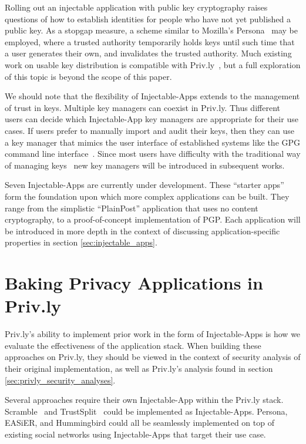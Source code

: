 \documentclass[letterpaper,twocolumn,10pt]{article}
\begin{document}
Rolling out an injectable application with public key cryptography raises 
questions of how to establish identities for people who have not yet published a 
public key. As a stopgap measure, a scheme similar to Mozilla's 
Persona~\cite{Mozilla.org2013}
may be employed, where a trusted authority temporarily holds keys until such time 
that a user generates their own, and invalidates the trusted authority. Much existing
work on usable key distribution is compatible with Priv.ly~\cite{Beato2011,LeapEncryptionAccessProject2013}, but a full exploration of
this topic is beyond the scope of this paper.

We should note that the flexibility of Injectable-Apps 
extends to the management of trust in keys. Multiple key managers can coexist in Priv.ly. 
Thus different users can decide which Injectable-App key managers are appropriate for
their use cases. If users prefer to manually import and audit
their keys, then they can use a key manager that mimics the user interface of 
established systems like the GPG command line interface~\cite{Project2013}. 
Since most users have difficulty with the traditional way of managing keys~\cite{Fahl2012,Whitten1999}
new key managers will be introduced in subsequent works.

Seven Injectable-Apps are currently under development. These ``starter apps'' form
the foundation upon which more complex applications can be built. They range from
the simplistic ``PlainPost'' application that uses no content cryptography, to
a proof-of-concept implementation of PGP. Each application will be introduced in
more depth in the context of discussing application-specific properties in section \ref{sec:injectable_apps}.

\section{Baking Privacy Applications in Priv.ly} \label{sec:privly_subsumed_use_cases}

Priv.ly's ability to implement prior work in the form of Injectable-Apps is how we 
evaluate the effectiveness of the application stack. When building these 
approaches on Priv.ly, they should be viewed in the context of security analysis of 
their original implementation, as well as Priv.ly's analysis found in section 
\ref{sec:privly_security_analyses}.

Several approaches require their own Injectable-App within the Priv.ly stack. 
Scramble~\cite{Beato2011} and TrustSplit~\cite{Fahl2012a} could be implemented as Injectable-Apps.
Persona, EASiER, and Hummingbird could all be seamlessly implemented on top of existing social networks
using Injectable-Apps that target their use case.
\end{document}
